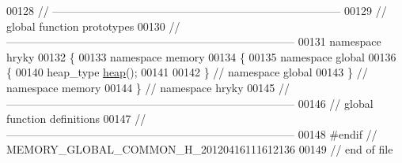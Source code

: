\begin{DoxyCode}
00128 \textcolor{comment}{//
      ------------------------------------------------------------------------------}
00129 \textcolor{comment}{// global function prototypes}
00130 \textcolor{comment}{//
      ------------------------------------------------------------------------------}
00131 \textcolor{keyword}{namespace }hryky
00132 \{
00133 \textcolor{keyword}{namespace }memory
00134 \{
00135 \textcolor{keyword}{namespace }global
00136 \{
00140     heap\_type \hyperlink{namespacehryky_1_1memory_1_1global_a6fc6103f67c837aa0f39b359588409cd}{heap}();
00141 
00142 \} \textcolor{comment}{// namespace global}
00143 \} \textcolor{comment}{// namespace memory}
00144 \} \textcolor{comment}{// namespace hryky}
00145 \textcolor{comment}{//
      ------------------------------------------------------------------------------}
00146 \textcolor{comment}{// global function definitions}
00147 \textcolor{comment}{//
      ------------------------------------------------------------------------------}
00148 \textcolor{preprocessor}{#endif // MEMORY\_GLOBAL\_COMMON\_H\_20120416111612136}
00149 \textcolor{preprocessor}{}\textcolor{comment}{// end of file}
\end{DoxyCode}
